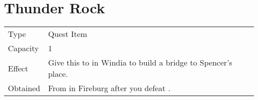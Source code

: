\section{Thunder Rock}
\label{item:thunder_rock}


\noindent\begin{tabularx}{\textwidth}[l]{lX}
	Type
	& Quest Item
\\ %
	Capacity
	& 1
\\ %
	Effect
	& Give this to \nameref{char:otto} in Windia to build a bridge to Spencer’s place.
\\ %
	Obtained
	& From \nameref{char:arion} in Fireburg after you defeat \nameref{monster:pazuzu}.
\end{tabularx}
